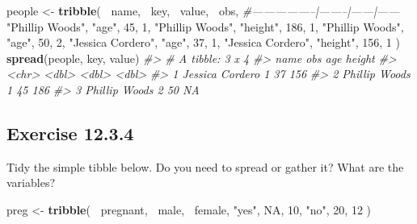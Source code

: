 \documentclass[]{book}
\newenvironment{Shaded}{\begin{snugshade}}{\end{snugshade}}
\newcommand{\CommentTok}[1]{\textcolor[rgb]{0.56,0.35,0.01}{\textit{#1}}}
\newcommand{\DecValTok}[1]{\textcolor[rgb]{0.00,0.00,0.81}{#1}}
\newcommand{\KeywordTok}[1]{\textcolor[rgb]{0.13,0.29,0.53}{\textbf{#1}}}
\newcommand{\NormalTok}[1]{#1}
\newcommand{\OperatorTok}[1]{\textcolor[rgb]{0.81,0.36,0.00}{\textbf{#1}}}
\newcommand{\OtherTok}[1]{\textcolor[rgb]{0.56,0.35,0.01}{#1}}
\newcommand{\StringTok}[1]{\textcolor[rgb]{0.31,0.60,0.02}{#1}}
\theoremstyle{plain}
\theoremstyle{remark}
\theoremstyle{definition}
\theoremstyle{definition}
\theoremstyle{definition}
\theoremstyle{remark}
\begin{document}
\begin{Shaded}
\begin{Highlighting}[]
\NormalTok{people <-}\StringTok{ }\KeywordTok{tribble}\NormalTok{(}
  \OperatorTok{~}\NormalTok{name,             }\OperatorTok{~}\NormalTok{key,    }\OperatorTok{~}\NormalTok{value, }\OperatorTok{~}\NormalTok{obs,}
  \CommentTok{#-----------------|--------|------|------}
  \StringTok{"Phillip Woods"}\NormalTok{,   }\StringTok{"age"}\NormalTok{,       }\DecValTok{45}\NormalTok{, }\DecValTok{1}\NormalTok{,}
  \StringTok{"Phillip Woods"}\NormalTok{,   }\StringTok{"height"}\NormalTok{,   }\DecValTok{186}\NormalTok{, }\DecValTok{1}\NormalTok{,}
  \StringTok{"Phillip Woods"}\NormalTok{,   }\StringTok{"age"}\NormalTok{,       }\DecValTok{50}\NormalTok{, }\DecValTok{2}\NormalTok{,}
  \StringTok{"Jessica Cordero"}\NormalTok{, }\StringTok{"age"}\NormalTok{,       }\DecValTok{37}\NormalTok{, }\DecValTok{1}\NormalTok{,}
  \StringTok{"Jessica Cordero"}\NormalTok{, }\StringTok{"height"}\NormalTok{,   }\DecValTok{156}\NormalTok{, }\DecValTok{1}
\NormalTok{)}
\KeywordTok{spread}\NormalTok{(people, key, value)}
\CommentTok{#> # A tibble: 3 x 4}
\CommentTok{#>   name              obs   age height}
\CommentTok{#>   <chr>           <dbl> <dbl>  <dbl>}
\CommentTok{#> 1 Jessica Cordero     1    37    156}
\CommentTok{#> 2 Phillip Woods       1    45    186}
\CommentTok{#> 3 Phillip Woods       2    50     NA}
\end{Highlighting}
\end{Shaded}

\hypertarget{exercise-12.3.4}{%
\subsection*{\texorpdfstring{Exercise
{12.3.4}}{Exercise 12.3.4}}\label{exercise-12.3.4}}

Tidy the simple tibble below. Do you need to spread or gather it? What
are the variables?

\begin{Shaded}
\begin{Highlighting}[]
\NormalTok{preg <-}\StringTok{ }\KeywordTok{tribble}\NormalTok{(}
  \OperatorTok{~}\NormalTok{pregnant, }\OperatorTok{~}\NormalTok{male, }\OperatorTok{~}\NormalTok{female,}
  \StringTok{"yes"}\NormalTok{,     }\OtherTok{NA}\NormalTok{,    }\DecValTok{10}\NormalTok{,}
  \StringTok{"no"}\NormalTok{,      }\DecValTok{20}\NormalTok{,    }\DecValTok{12}
\NormalTok{)}
\end{Highlighting}
\end{Shaded}
\end{document}
